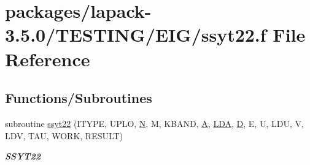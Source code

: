 \hypertarget{ssyt22_8f}{}\section{packages/lapack-\/3.5.0/\+T\+E\+S\+T\+I\+N\+G/\+E\+I\+G/ssyt22.f File Reference}
\label{ssyt22_8f}
\subsection*{Functions/\+Subroutines}
\begin{DoxyCompactItemize}
\item 
subroutine \hyperlink{group__single__eig_ga4031914169fb1a0ddfd7dd67359c8b4f}{ssyt22} (I\+T\+Y\+P\+E, U\+P\+L\+O, \hyperlink{polmisc_8c_a0240ac851181b84ac374872dc5434ee4}{N}, M, K\+B\+A\+N\+D, \hyperlink{classA}{A}, \hyperlink{example__user_8c_ae946da542ce0db94dced19b2ecefd1aa}{L\+D\+A}, \hyperlink{odrpack_8h_a7dae6ea403d00f3687f24a874e67d139}{D}, E, U, L\+D\+U, V, L\+D\+V, T\+A\+U, W\+O\+R\+K, R\+E\+S\+U\+L\+T)
\begin{DoxyCompactList}\small\item\em {\bfseries S\+S\+Y\+T22} \end{DoxyCompactList}\end{DoxyCompactItemize}
